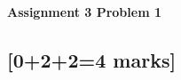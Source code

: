 \documentclass[12pt]{article}
\begin{document}
	
	\begin{center}
		{\Large\bf Assignment 3 Problem 1}\\
		\vspace{3mm}
	\end{center}
	
	\def\question#1{\item[\bf #1.]}
	\def\part#1{\item[\bf #1)]}
	\newcommand{\pc}[1]{\mbox{\textbf{#1}}} %
	
	
	
	
	\subsection{[0+2+2=4 marks]}
	
\end{document}
